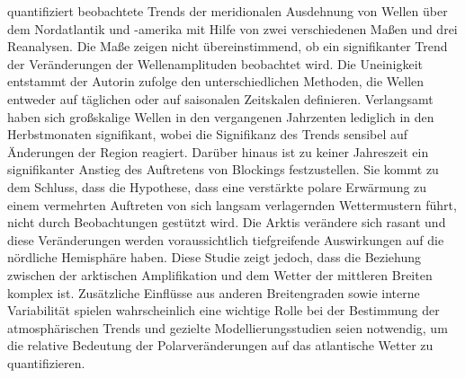 \citet{barnes-2013-a} quantifiziert beobachtete Trends der meridionalen Ausdehnung von Wellen über dem Nordatlantik und -amerika mit Hilfe von zwei verschiedenen Maßen und drei Reanalysen. Die Maße zeigen nicht übereinstimmend, ob ein signifikanter Trend der Veränderungen der Wellenamplituden beobachtet wird. Die Uneinigkeit entstammt der Autorin zufolge den unterschiedlichen Methoden, die Wellen entweder auf täglichen oder auf saisonalen Zeitskalen definieren. Verlangsamt haben sich großskalige Wellen in den vergangenen Jahrzenten lediglich in den Herbstmonaten signifikant, wobei die Signifikanz des Trends sensibel auf Änderungen der Region reagiert. Darüber hinaus ist zu keiner Jahreszeit ein signifikanter Anstieg des Auftretens von Blockings festzustellen. Sie kommt zu dem Schluss, dass die Hypothese, dass eine verstärkte polare Erwärmung zu einem vermehrten Auftreten von sich langsam verlagernden Wettermustern führt, nicht durch Beobachtungen gestützt wird. Die Arktis verändere sich rasant und diese Veränderungen werden voraussichtlich tiefgreifende Auswirkungen auf die nördliche Hemisphäre haben. Diese Studie zeigt jedoch, dass die Beziehung zwischen der arktischen Amplifikation und dem Wetter der mittleren Breiten komplex ist. Zusätzliche Einflüsse aus anderen Breitengraden sowie interne Variabilität spielen wahrscheinlich eine wichtige Rolle bei der Bestimmung der atmosphärischen Trends und gezielte Modellierungsstudien seien notwendig, um die relative Bedeutung der Polarveränderungen auf das atlantische Wetter zu quantifizieren.

